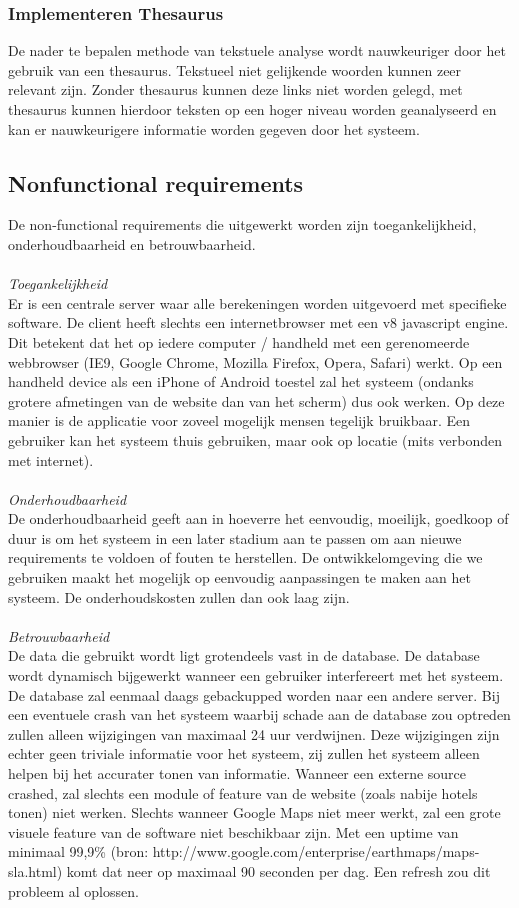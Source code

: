 \documentclass[a4paper,10pt]{article}
\begin{document}
			\subsubsection{Implementeren Thesaurus}
			De nader te bepalen methode van tekstuele analyse wordt nauwkeuriger door het gebruik van een thesaurus. Tekstueel niet gelijkende woorden kunnen zeer relevant zijn. Zonder thesaurus kunnen deze links niet worden gelegd, met thesaurus kunnen hierdoor teksten op een hoger niveau worden geanalyseerd en kan er nauwkeurigere informatie worden gegeven door het systeem.
		
		\subsection{Nonfunctional requirements}
			De non-functional requirements die uitgewerkt worden zijn toegankelijkheid, onderhoudbaarheid en betrouwbaarheid.\\	\\
			\textit{Toegankelijkheid}\\
			Er is een centrale server waar alle berekeningen worden uitgevoerd met specifieke software. De client heeft slechts een internetbrowser met een v8 javascript engine. Dit betekent dat het op iedere computer / handheld met een gerenomeerde webbrowser (IE9, Google Chrome, Mozilla Firefox, Opera, Safari) werkt. Op een handheld device als een iPhone of Android toestel zal het systeem (ondanks grotere afmetingen van de website dan van het scherm) dus ook werken. Op deze manier is de applicatie voor zoveel mogelijk mensen tegelijk bruikbaar. Een gebruiker kan het systeem thuis gebruiken, maar ook op locatie (mits verbonden met internet).\\ \\
			\textit{Onderhoudbaarheid}\\
			De onderhoudbaarheid geeft aan in hoeverre het eenvoudig, moeilijk, goedkoop of duur is om het systeem in een later stadium aan te passen om aan nieuwe requirements te voldoen of fouten te herstellen. De ontwikkelomgeving die we gebruiken maakt het mogelijk op eenvoudig aanpassingen te maken aan het systeem. De onderhoudskosten zullen dan ook laag zijn.\\ \\
			\textit{Betrouwbaarheid}\\
			De data die gebruikt wordt ligt grotendeels vast in de database. De database wordt dynamisch bijgewerkt wanneer een gebruiker interfereert met het systeem. De database zal eenmaal daags gebackupped worden naar een andere server. Bij een eventuele crash van het systeem waarbij schade aan de database zou optreden zullen alleen wijzigingen van maximaal 24 uur verdwijnen. Deze wijzigingen zijn echter geen triviale informatie voor het systeem, zij zullen het systeem alleen helpen bij het accurater tonen van informatie. Wanneer een externe source crashed, zal slechts een module of feature van de website (zoals nabije hotels tonen) niet werken. Slechts wanneer Google Maps niet meer werkt, zal een grote visuele feature van de software niet beschikbaar zijn. Met een uptime van minimaal 99,9\% (bron: http://www.google.com/enterprise/earthmaps/maps-sla.html) komt dat neer op maximaal 90 seconden per dag. Een refresh zou dit probleem al oplossen.
			
\end{document}
